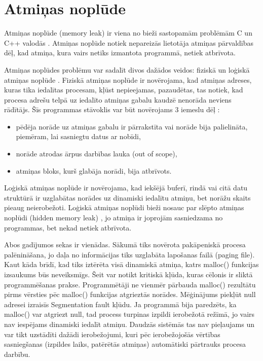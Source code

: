 ﻿\section{Atmiņas noplūde}


Atmiņas noplūde (memory leak) ir viena no bieži sastopamām problēmām C un C++ valodās \cite{atparv}.
Atmiņas noplūde notiek nepareizās lietotāja atmiņas pārvaldības dēļ, kad atmiņa, kura vairs netiks izmantota programmā, netiek atbrīvota.

Atmiņas noplūdes problēmu var sadalīt divos dažādos veidos: fiziskā un loģiskā atmiņas noplūde \cite{JMMR}.
Fiziskā atmiņas noplūde ir novērojama, kad atmiņas adreses, kuras tika iedalītas procesam,  kļūst nepieejamas, pazaudētas, tas notiek, kad procesa adrešu telpā uz iedalīto atmiņas gabalu kaudzē nenorāda neviens rādītājs.
Šīs programmas stāvoklis var būt novērojams 3 iemeslu dēļ \cite{JMMR}:
\begin{itemize}
\item pēdēja norāde uz atmiņas gabalu ir pārrakstīta vai norāde bija palielināta, piemēram, lai sasniegtu datus ar nobīdi,
\item norāde atrodas ārpus darbības lauka (out of scope),
\item atmiņas bloks, kurš glabāja norādi, bija atbrīvots.
\end{itemize}

Loģiskā atmiņas noplūde ir novērojama, kad iekšējā buferī, rindā vai citā datu struktūrā ir uzglabātas norādes uz dinamiski iedalītu atmiņu, bet norāžu skaits pieaug neierobežoti.
Loģiskā atmiņas noplūdi bieži nosauc par slēpto atmiņas noplūdi (hidden memory leak) \cite{RRUU}, jo atmiņa ir joprojām sasniedzama no programmas, bet nekad netiek atbrīvota.

Abos gadījumos sekas ir vienādas.
Sākumā tiks novērota pakāpeniskā procesa palēnināšana, jo daļa no informācijas tiks uzglabāta lapošanas failā (paging file).
Kaut kāda brīdī, kad tiks iztērēta visā dinamiskā atmiņa, katrs malloc() funkcijas izsaukums būs neveiksmīgs.
Šeit var notikt kritiskā kļūda, kuras cēlonis ir sliktā programmēšanas prakse.
Programmētāji ne vienmēr pārbauda malloc() rezultātu pirms vērsties pēc malloc() funkcijas atgrieztās norādes.  
Mēģinājums piekļūt null adresei  izraisīs Segmentation fault kļūdu.
Ja programmā bija paredzēts, ka malloc() var atgriezt null, tad process turpinas izpildi ierobežotā režīmā, jo vairs nav iespējams dinamiski iedalīt atmiņu. 
Daudzās sistēmās tas nav pieļaujams un var tikt uzstādīti dažādi ierobežojumi, kuri pēc ierobežojošās vērtības sasniegšanas (izpildes laiks, patērētās atmiņas) automātiski pārtrauks procesa darbību. 


